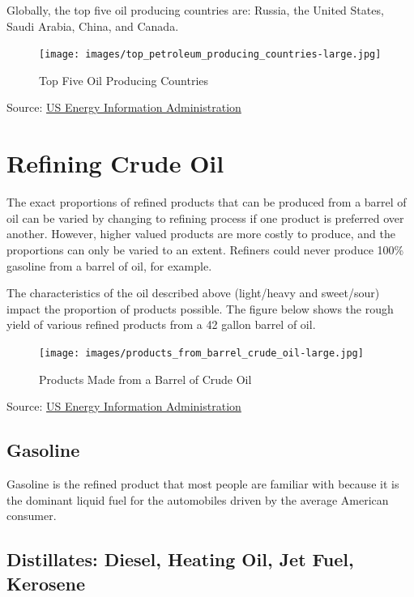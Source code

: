 \documentclass[
]{book}
\begin{document}
Globally, the top five oil producing countries are: Russia, the United States, Saudi Arabia, China, and Canada.

\begin{figure}
\centering
\texttt{[image: images/top\_petroleum\_producing\_countries-large.jpg]}
\caption{Top Five Oil Producing Countries}
\end{figure}

Source: \href{http://www.eia.gov/Energyexplained/index.cfm?page=oil_home}{US Energy Information Administration}

\hypertarget{refining-crude-oil}{%
\section{Refining Crude Oil}\label{refining-crude-oil}}

The exact proportions of refined products that can be produced from a barrel of oil can be varied by changing to refining process if one product is preferred over another. However, higher valued products are more costly to produce, and the proportions can only be varied to an extent. Refiners could never produce 100\% gasoline from a barrel of oil, for example.

The characteristics of the oil described above (light/heavy and sweet/sour) impact the proportion of products possible. The figure below shows the rough yield of various refined products from a 42 gallon barrel of oil.

\begin{figure}
\centering
\texttt{[image: images/products\_from\_barrel\_crude\_oil-large.jpg]}
\caption{Products Made from a Barrel of Crude Oil}
\end{figure}

Source: \href{http://www.eia.gov/Energyexplained/index.cfm?page=oil_home}{US Energy Information Administration}

\hypertarget{gasoline}{%
\subsection{Gasoline}\label{gasoline}}

Gasoline is the refined product that most people are familiar with because it is the dominant liquid fuel for the automobiles driven by the average American consumer.

\hypertarget{distillates-diesel-heating-oil-jet-fuel-kerosene}{%
\subsection{Distillates: Diesel, Heating Oil, Jet Fuel, Kerosene}\label{distillates-diesel-heating-oil-jet-fuel-kerosene}}
\end{document}
